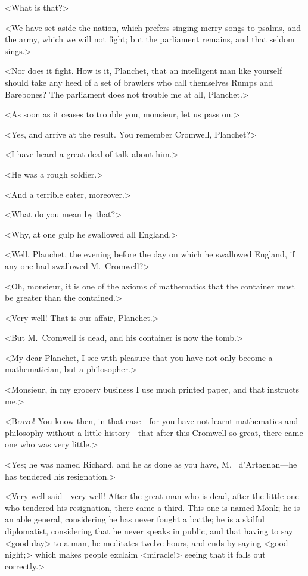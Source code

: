 <What is that?>

<We have set aside the nation, which prefers singing merry songs to psalms, and the army, which we will not fight; but the parliament remains, and that seldom sings.>

<Nor does it fight. How is it, Planchet, that an intelligent man like yourself should take any heed of a set of brawlers who call themselves Rumps and Barebones? The parliament does not trouble me at all, Planchet.>

<As soon as it ceases to trouble you, monsieur, let us pass on.>

<Yes, and arrive at the result. You remember Cromwell, Planchet?>

<I have heard a great deal of talk about him.>

<He was a rough soldier.>

<And a terrible eater, moreover.>

<What do you mean by that?>

<Why, at one gulp he swallowed all England.>

<Well, Planchet, the evening before the day on which he swallowed England, if any one had swallowed M.~Cromwell?>

<Oh, monsieur, it is one of the axioms of mathematics that the container must be greater than the contained.>

<Very well! That is our affair, Planchet.>

<But M.~Cromwell is dead, and his container is now the tomb.>

<My dear Planchet, I see with pleasure that you have not only become a mathematician, but a philosopher.>

<Monsieur, in my grocery business I use much printed paper, and that instructs me.>

<Bravo! You know then, in that case—for you have not learnt mathematics and philosophy without a little history—that after this Cromwell so great, there came one who was very little.>

<Yes; he was named Richard, and he as done as you have, M.~ d'Artagnan—he has tendered his resignation.>

<Very well said—very well! After the great man who is dead, after the little one who tendered his resignation, there came a third. This one is named Monk; he is an able general, considering he has never fought a battle; he is a skilful diplomatist, considering that he never speaks in public, and that having to say <good-day> to a man, he meditates twelve hours, and ends by saying <good night;> which makes people exclaim <miracle!> seeing that it falls out correctly.>

